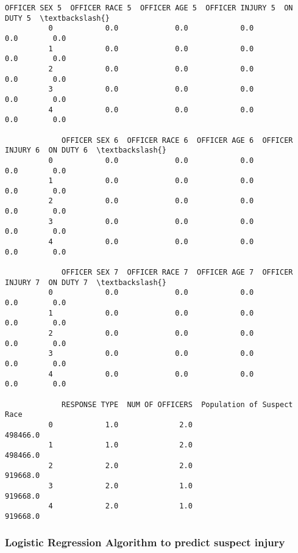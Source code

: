 \documentclass[11pt]{article}
\begin{document}
\begin{Verbatim}[commandchars=\\\{\}]
             OFFICER SEX 5  OFFICER RACE 5  OFFICER AGE 5  OFFICER INJURY 5  ON DUTY 5  \textbackslash{}
          0            0.0             0.0            0.0               0.0        0.0   
          1            0.0             0.0            0.0               0.0        0.0   
          2            0.0             0.0            0.0               0.0        0.0   
          3            0.0             0.0            0.0               0.0        0.0   
          4            0.0             0.0            0.0               0.0        0.0   
          
             OFFICER SEX 6  OFFICER RACE 6  OFFICER AGE 6  OFFICER INJURY 6  ON DUTY 6  \textbackslash{}
          0            0.0             0.0            0.0               0.0        0.0   
          1            0.0             0.0            0.0               0.0        0.0   
          2            0.0             0.0            0.0               0.0        0.0   
          3            0.0             0.0            0.0               0.0        0.0   
          4            0.0             0.0            0.0               0.0        0.0   
          
             OFFICER SEX 7  OFFICER RACE 7  OFFICER AGE 7  OFFICER INJURY 7  ON DUTY 7  \textbackslash{}
          0            0.0             0.0            0.0               0.0        0.0   
          1            0.0             0.0            0.0               0.0        0.0   
          2            0.0             0.0            0.0               0.0        0.0   
          3            0.0             0.0            0.0               0.0        0.0   
          4            0.0             0.0            0.0               0.0        0.0   
          
             RESPONSE TYPE  NUM OF OFFICERS  Population of Suspect Race  
          0            1.0              2.0                    498466.0  
          1            1.0              2.0                    498466.0  
          2            2.0              2.0                    919668.0  
          3            2.0              1.0                    919668.0  
          4            2.0              1.0                    919668.0  
\end{Verbatim}
            
    \subsubsection{Logistic Regression Algorithm to predict suspect
injury}\label{logistic-regression-algorithm-to-predict-suspect-injury}
\end{document}
